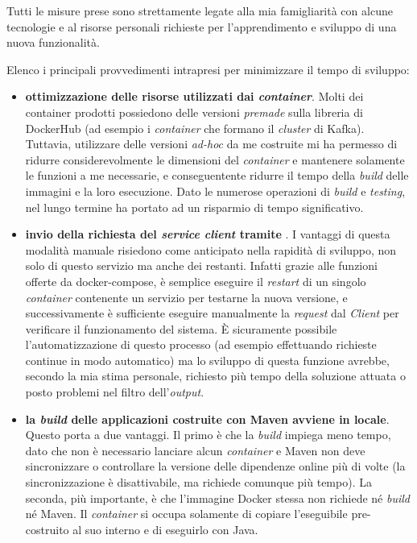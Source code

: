 Tutti le misure prese sono strettamente legate alla mia famigliarità con alcune tecnologie e al risorse personali richieste per l'apprendimento e sviluppo di una nuova funzionalità.

\bigskip\noindent
Elenco i principali provvedimenti intrapresi per minimizzare il tempo di sviluppo:
\begin{itemize}
  \item \textbf{ottimizzazione delle risorse utilizzati dai \textit{container}}.
  Molti dei container prodotti possiedono delle versioni \textit{premade} sulla libreria di DockerHub (ad esempio i \textit{container} che formano il \textit{cluster} di Kafka).
  Tuttavia, utilizzare delle versioni \textit{ad-hoc} da me costruite mi ha permesso di ridurre considerevolmente le dimensioni del \textit{container} e mantenere solamente le funzioni a me necessarie, e conseguentente ridurre il tempo della \textit{build} delle immagini e la loro esecuzione. Dato le numerose operazioni di \textit{build} e \textit{testing}, nel lungo termine ha portato ad un risparmio di tempo significativo.
  \item \textbf{invio della richiesta  del \textit{service client} tramite }.
  I vantaggi di questa modalità manuale risiedono come anticipato nella rapidità di sviluppo, non solo di questo servizio ma anche dei restanti.
  Infatti grazie alle funzioni offerte da docker-compose, è semplice eseguire il \textit{restart} di un singolo \textit{container} contenente un servizio per testarne la nuova versione, e successivamente è sufficiente eseguire manualmente la \textit{request} dal  \textit{Client} per verificare il funzionamento del sistema.
  È sicuramente possibile l'automatizzazione di questo processo (ad esempio effettuando richieste continue in modo automatico) ma lo sviluppo di questa funzione avrebbe, secondo la mia stima personale, richiesto più tempo della soluzione attuata o posto problemi nel filtro dell'\textit{output}.
  \item \textbf{la \textit{build} delle applicazioni costruite con Maven avviene in locale}.
  Questo porta a due vantaggi.
  Il primo è che la \textit{build} impiega meno tempo, dato che non è necessario lanciare alcun \textit{container} e Maven non deve sincronizzare o controllare la versione delle dipendenze online più di volte (la sincronizzazione è disattivabile, ma richiede comunque più tempo).
  La seconda, più importante, è che l'immagine Docker stessa non richiede né \textit{build} né Maven.
  Il \textit{container} si occupa solamente di copiare l'eseguibile pre-costruito al suo interno e di eseguirlo con Java.
\end{itemize}

